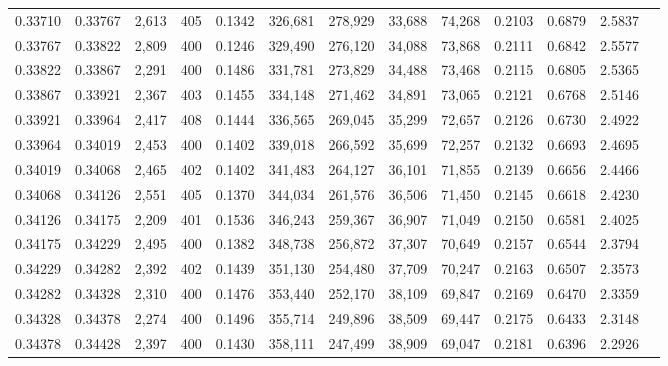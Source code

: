 \begin{tabular}{rrrrrrrrrrrrr}
0.33710 & 0.33767 &  2,613 & 405 &                                     0.1342 & 326,681 & 278,929 &  33,688 &  74,268 & 0.2103 & 0.6879 & 2.5837 \\
0.33767 & 0.33822 &  2,809 & 400 &                                     0.1246 & 329,490 & 276,120 &  34,088 &  73,868 & 0.2111 & 0.6842 & 2.5577 \\
0.33822 & 0.33867 &  2,291 & 400 &                                     0.1486 & 331,781 & 273,829 &  34,488 &  73,468 & 0.2115 & 0.6805 & 2.5365 \\
0.33867 & 0.33921 &  2,367 & 403 &                                     0.1455 & 334,148 & 271,462 &  34,891 &  73,065 & 0.2121 & 0.6768 & 2.5146 \\
0.33921 & 0.33964 &  2,417 & 408 &                                     0.1444 & 336,565 & 269,045 &  35,299 &  72,657 & 0.2126 & 0.6730 & 2.4922 \\
0.33964 & 0.34019 &  2,453 & 400 &                                     0.1402 & 339,018 & 266,592 &  35,699 &  72,257 & 0.2132 & 0.6693 & 2.4695 \\
0.34019 & 0.34068 &  2,465 & 402 &                                     0.1402 & 341,483 & 264,127 &  36,101 &  71,855 & 0.2139 & 0.6656 & 2.4466 \\
0.34068 & 0.34126 &  2,551 & 405 &                                     0.1370 & 344,034 & 261,576 &  36,506 &  71,450 & 0.2145 & 0.6618 & 2.4230 \\
0.34126 & 0.34175 &  2,209 & 401 &                                     0.1536 & 346,243 & 259,367 &  36,907 &  71,049 & 0.2150 & 0.6581 & 2.4025 \\
0.34175 & 0.34229 &  2,495 & 400 &                                     0.1382 & 348,738 & 256,872 &  37,307 &  70,649 & 0.2157 & 0.6544 & 2.3794 \\
0.34229 & 0.34282 &  2,392 & 402 &                                     0.1439 & 351,130 & 254,480 &  37,709 &  70,247 & 0.2163 & 0.6507 & 2.3573 \\
0.34282 & 0.34328 &  2,310 & 400 &                                     0.1476 & 353,440 & 252,170 &  38,109 &  69,847 & 0.2169 & 0.6470 & 2.3359 \\
0.34328 & 0.34378 &  2,274 & 400 &                                     0.1496 & 355,714 & 249,896 &  38,509 &  69,447 & 0.2175 & 0.6433 & 2.3148 \\
0.34378 & 0.34428 &  2,397 & 400 &                                     0.1430 & 358,111 & 247,499 &  38,909 &  69,047 & 0.2181 & 0.6396 & 2.2926 \\

\end{tabular}
